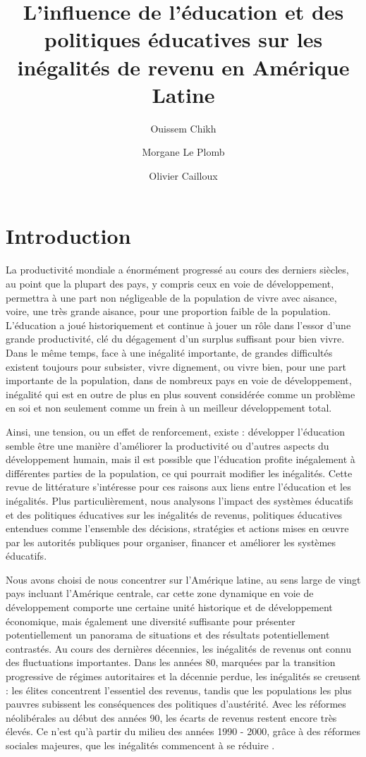 \documentclass[pagesize, twoside=off, bibliography=totoc, DIV=calc, fontsize=12pt, a4paper, french]{scrartcl}
\title{L’influence de l’éducation et des politiques éducatives sur les inégalités de revenu en Amérique Latine}
\author{Ouissem Chikh}
\author{Morgane Le Plomb}
\author{Olivier Cailloux}
\affil{Université Paris-Dauphine, PSL Research University, CNRS, 75016 PARIS, FRANCE}
\begin{document}
\maketitle
{}
\tableofcontents
\newpage
\setcounter{page}{1}

\section{Introduction}

La productivité mondiale a énormément progressé au cours des derniers siècles, au point que la plupart des pays, y compris ceux en voie de développement, permettra à une part non négligeable de la population de vivre avec aisance, voire, une très grande aisance, pour une proportion faible de la population. L’éducation a joué historiquement et continue à jouer un rôle dans l’essor d’une grande productivité, clé du dégagement d’un surplus suffisant pour bien vivre. Dans le même temps, face à une inégalité importante, de grandes difficultés existent toujours pour subsister, vivre dignement, ou vivre bien, pour une part importante de la population, dans de nombreux pays en voie de développement, inégalité qui est en outre de plus en plus souvent considérée comme un problème en soi et non seulement comme un frein à un meilleur développement total.

Ainsi, une tension, ou un effet de renforcement, existe : développer l’éducation semble être une manière d’améliorer la productivité ou d’autres aspects du développement humain, mais il est possible que l’éducation profite inégalement à différentes parties de la population, ce qui pourrait modifier les inégalités. Cette revue de littérature s’intéresse pour ces raisons aux liens entre l’éducation et les inégalités. Plus particulièrement, nous analysons l’impact des systèmes éducatifs et des politiques éducatives sur les inégalités de revenus, politiques éducatives entendues comme l’ensemble des décisions, stratégies et actions mises en œuvre par les autorités publiques pour organiser, financer et améliorer les systèmes éducatifs.

Nous avons choisi de nous concentrer sur l’Amérique latine, au sens large de vingt pays incluant l’Amérique centrale, car cette zone dynamique en voie de développement comporte une certaine unité historique et de développement économique, mais également une diversité suffisante pour présenter potentiellement un panorama de situations et des résultats potentiellement contrastés. Au cours des dernières décennies, les inégalités de revenus ont connu des fluctuations importantes. Dans les années 80, marquées par la transition progressive de régimes autoritaires et la \og{}décennie perdue\fg{}, les inégalités se creusent : les élites concentrent l’essentiel des revenus, tandis que les populations les plus pauvres subissent les conséquences des politiques d’austérité. Avec les réformes néolibérales au début des années 90, les écarts de revenus restent encore très élevés. Ce n’est qu’à partir du milieu des années 1990 - 2000, grâce à des réformes sociales majeures, que les inégalités commencent à se réduire \citep{cruces_falling_2014}.
\end{document}
